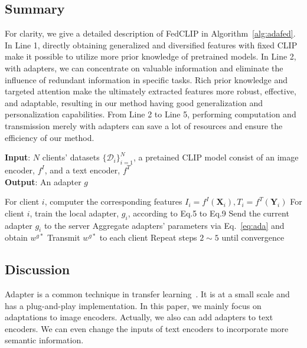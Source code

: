 \documentclass[11pt]{article}
\newcommand{\algorithmname}{Algorithm}
\newcommand{\equationname}{Eq.}
\newcommand{\method}{FedCLIP\xspace}
\newcommand{\wjd}[1]{{\color{cyan}{[(WJD): #1]}}}
\begin{document}
\subsection{Summary}
For clarity, we give a detailed description of \method in \algorithmname~\ref{alg:adafed}.
In Line 1, directly obtaining generalized and diversified features with fixed CLIP make it possible to utilize more prior knowledge of pretrained models.
In Line 2, with adapters, we can concentrate on valuable information and eliminate the influence of redundant information in specific tasks.
Rich prior knowledge and targeted attention make the ultimately extracted features more robust, effective, and adaptable, resulting in our method having good generalization and personalization capabilities.
From Line 2 to Line 5, performing computation and transmission merely with adapters can save a lot of resources and ensure the efficiency of our method.

\begin{algorithm}[htb]
\caption{\method}
\label{alg:adafed}
\textbf{Input}: $N$ clients' datasets $\{\mathcal{D}_i\}_{i=1}^N$, a pretained CLIP model consist of an image encoder, $f^I$, and a text encoder, $f^T$\\
\textbf{Output}: An adapter $g$
\begin{algorithmic}[1] %
\State For client $i$, computer the corresponding features $I_i=f^I(\mathbf{X}_i), T_i=f^T(\mathbf{Y}_i)$
\State For client $i$, train the local adapter, $g_i$, according to \equationname 5 to \equationname 9
\State Send the current adapter $g_i$ to the server
\State Aggregate adapters' parameters via \equationname~\ref{eq:ada} and obtain $w^{g*}$
\State Transmit $w^{g*}$ to each client
\State Repeat steps $2 \sim 5$ until convergence
\end{algorithmic}
\end{algorithm}

\subsection{Discussion}
Adapter is a common technique in transfer learning~\cite{Jindong-wenxinhou22}.
It is at a small scale and has a plug-and-play implementation.
In this paper, we mainly focus on adaptations to image encoders.
Actually, we also can add adapters to text encoders.
We can even change the inputs of text encoders to incorporate more semantic information.
\end{document}
